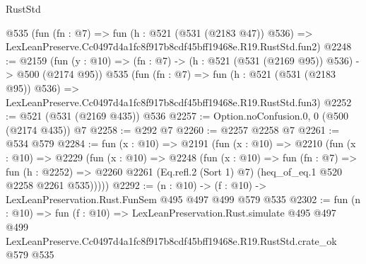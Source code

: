 \begin{lexlean}{RustStd}
\begin{coremodule}
    @535
    (fun (fn : @7) =>
    fun (h : @521 (@531 (@2183 @47)) @536) =>
    LexLeanPreserve.Cc0497d4a1fc8f917b8cdf45bff19468e.R19.RustStd.fun2)
@2248 := @2159
    (fun (y : @10) => (fn : @7) -> (h : @521 (@531 (@2169 @95)) @536) -> @500 (@2174 @95))
    @535
    (fun (fn : @7) =>
    fun (h : @521 (@531 (@2183 @95)) @536) =>
    LexLeanPreserve.Cc0497d4a1fc8f917b8cdf45bff19468e.R19.RustStd.fun3)
@2252 := @521 (@531 (@2169 @435)) @536
@2257 := Option.noConfusion.{0, 0} (@500 (@2174 @435)) @7
@2258 := @292 @7
@2260 := @2257 @2258 @7
@2261 := @534 @579
@2284 := fun (x : @10) =>
  @2191
    (fun (x : @10) =>
    @2210
      (fun (x : @10) =>
      @2229
        (fun (x : @10) =>
        @2248
          (fun (x : @10) =>
          fun (fn : @7) =>
          fun (h : @2252) =>
          @2260 @2261 (Eq.refl.{2} (Sort 1) @7) (heq_of_eq.{1} @520 @2258 @2261 @535)))))
@2292 := (n : @10) -> (f : @10) -> LexLeanPreservation.Rust.FunSem @495 @497 @499 @579 @535
@2302 := fun (n : @10) =>
  fun (f : @10) =>
  LexLeanPreservation.Rust.simulate
    @495
    @497
    @499
    LexLeanPreserve.Cc0497d4a1fc8f917b8cdf45bff19468e.R19.RustStd.crate_ok
    @579
    @535
\end{coremodule}
\end{lexlean}
